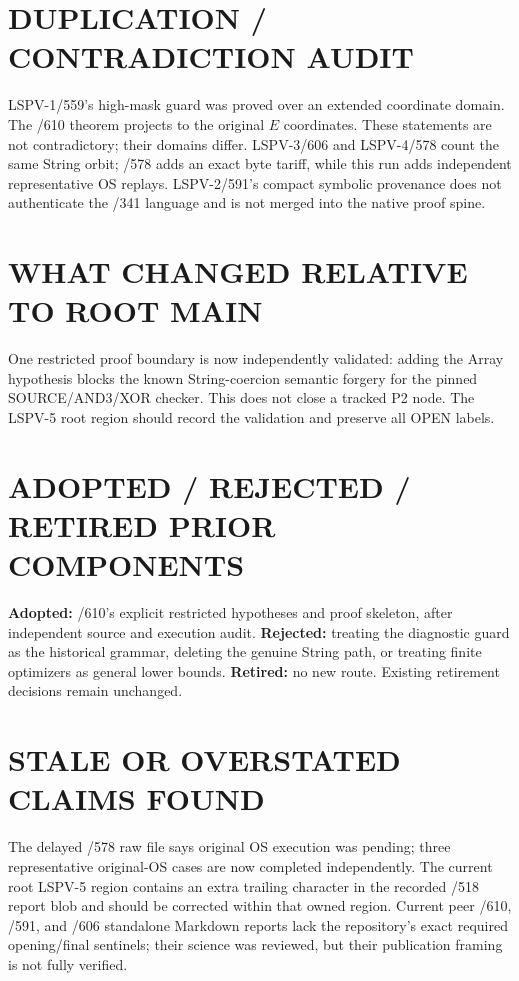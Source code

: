 \documentclass[11pt]{article}
\begin{document}
\section*{DUPLICATION / CONTRADICTION AUDIT}
LSPV-1/559's high-mask guard was proved over an extended coordinate domain.
The /610 theorem projects to the original $E$ coordinates.  These statements
are not contradictory; their domains differ.  LSPV-3/606 and LSPV-4/578 count
the same String orbit; /578 adds an exact byte tariff, while this run adds
independent representative OS replays.  LSPV-2/591's compact symbolic
provenance does not authenticate the /341 language and is not merged into the
native proof spine.

\section*{WHAT CHANGED RELATIVE TO ROOT MAIN}
One restricted proof boundary is now independently validated: adding the
Array hypothesis blocks the known String-coercion semantic forgery for the
pinned SOURCE/AND3/XOR checker.  This does not close a tracked P2 node.  The
LSPV-5 root region should record the validation and preserve all OPEN labels.

\section*{ADOPTED / REJECTED / RETIRED PRIOR COMPONENTS}
\textbf{Adopted:} /610's explicit restricted hypotheses and proof skeleton,
after independent source and execution audit.  \textbf{Rejected:} treating the
diagnostic guard as the historical grammar, deleting the genuine String path,
or treating finite optimizers as general lower bounds.  \textbf{Retired:} no
new route.  Existing retirement decisions remain unchanged.

\section*{STALE OR OVERSTATED CLAIMS FOUND}
The delayed /578 raw file says original OS execution was pending; three
representative original-OS cases are now completed independently.  The current
root LSPV-5 region contains an extra trailing character in the recorded /518
report blob and should be corrected within that owned region.  Current peer
/610, /591, and /606 standalone Markdown reports lack the repository's exact
required opening/final sentinels; their science was reviewed, but their
publication framing is not fully verified.
\end{document}
